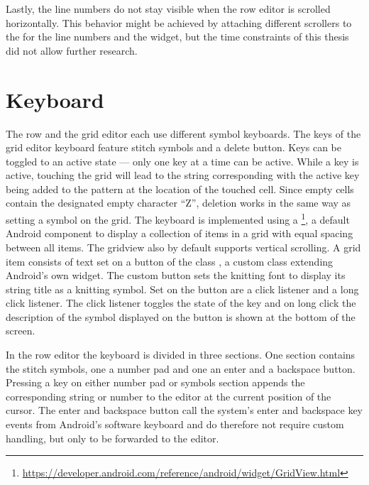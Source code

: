 Lastly, the line numbers do not stay visible when the row editor is scrolled horizontally. This behavior might be achieved by attaching different scrollers to the  for the line numbers and the  widget, but the time constraints of this thesis did not allow further research. 

\section{Keyboard}
The row and the grid editor each use different symbol keyboards. The keys of the grid editor keyboard feature stitch symbols and a delete button. Keys can be toggled to an active state --- only one key at a time can be active. While a key is active, touching the grid will lead to the string corresponding with the active key being added to the pattern at the location of the touched cell. Since empty cells contain the designated empty character ``Z'', deletion works in the same way as setting a symbol on the grid. The keyboard is implemented using a \footnote{\url{https://developer.android.com/reference/android/widget/GridView.html}}, a default Android component to display a collection of items in a grid with equal spacing between all items. The gridview also by default supports vertical scrolling. A grid item consists of text set on a button of the class , a custom class extending Android’s own  widget. The custom button sets the knitting font to display its string title as a knitting symbol. Set on the button are a click listener and a long click listener. The click listener toggles the state of the key and on long click the description of the symbol displayed on the button is shown at the bottom of the screen.

In the row editor the keyboard is divided in three sections. One section contains the stitch symbols, one a number pad and one an enter and a backspace button. Pressing a key on either number pad or symbols section appends the corresponding string or number to the editor at the current position of the cursor. The enter and backspace button call the system’s enter and backspace key events from Android’s software keyboard and do therefore not require custom handling, but only to be forwarded to the editor.

